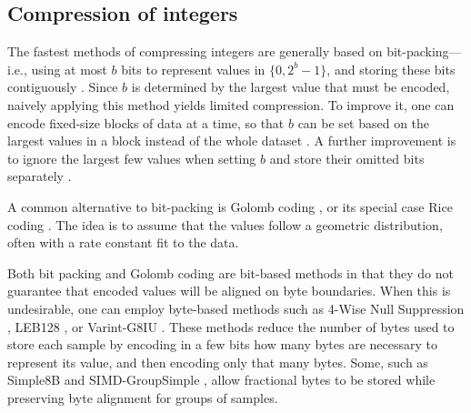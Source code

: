\subsection{Compression of integers}


The fastest methods of compressing integers are generally based on bit-packing---i.e., using at most $b$ bits to represent values in $\{0, 2^b-1\}$, and storing these bits contiguously \cite{bbp, pfor, fastpfor}. Since $b$ is determined by the largest value that must be encoded, naively applying this method yields limited compression. To improve it, one can encode fixed-size blocks of data at a time, so that $b$ can be set based on the largest values in a block instead of the whole dataset \cite{kGamma, pfor, fastpfor}. A further improvement is to ignore the largest few values when setting $b$ and store their omitted bits separately \cite{pfor, fastpfor}.

A common \cite{flac, shorten} alternative to bit-packing is Golomb coding \cite{golomb}, or its special case Rice coding \cite{rice}. The idea is to assume that the values follow a geometric distribution, often with a rate constant fit to the data. %

Both bit packing and Golomb coding are bit-based methods in that they do not guarantee that encoded values will be aligned on byte boundaries. When this is undesirable, one can employ byte-based methods such as 4-Wise Null Suppression \cite{kGamma}, LEB128 \cite{dwarf}, or Varint-G8IU \cite{varintG8IU}. These methods reduce the number of bytes used to store each sample by encoding in a few bits how many bytes are necessary to represent its value, and then encoding only that many bytes. Some, such as Simple8B \cite{simple8b} and SIMD-GroupSimple \cite{groupSimd}, allow fractional bytes to be stored while preserving byte alignment for groups of samples. %



